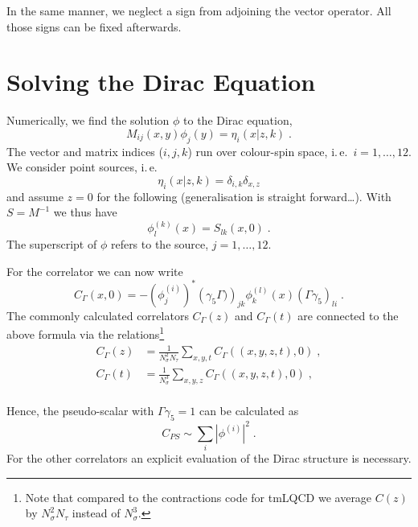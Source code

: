 \documentclass[a4paper]{article}
\begin{document}
In the same manner, we neglect a sign from adjoining the vector operator. All those signs can be fixed afterwards.


\section{Solving the Dirac Equation}
Numerically, we find the solution $\phi$ to the Dirac equation,
\begin{equation}
M_{ij}(x,y) \phi_j(y) = \eta_i(x|z,k)\;.
\end{equation}
The vector and matrix indices ($i,j,k$) run over colour-spin space, i.\,e.\ $i=1,\ldots,12$. We consider point sources, i.\,e.\
\begin{equation}
\eta_i(x|z,k) = \delta_{i,k} \delta_{x,z}
\end{equation}
and assume $z=0$ for the following (generalisation is straight forward\ldots).  With $S=M^{-1}$ we thus have
\begin{equation}
\phi_l^{(k)}(x) = S_{lk}(x,0)\;.
\end{equation}
The superscript of $\phi$ refers to the source, $j=1,\ldots,12$.

For the correlator we can now write
\begin{equation}
C_\Gamma(x,0) = - \left(\phi_j^{(i)}\right)^* \left(\gamma_5\Gamma)\right)_{jk} \phi_k^{(l)}(x) \left(\Gamma\gamma_5\right)_{li}\;.
\end{equation}
The commonly calculated correlators $C_\Gamma(z)$ and $C_\Gamma(t)$ are connected to the above formula via the relations\footnote{Note that compared to the contractions code for tmLQCD we average $C(z)$ by $N_\sigma^2N_\tau$ instead of $N_\sigma^3$.}
\begin{subequations}
\begin{align}
C_\Gamma(z) & = \frac{1}{N_\sigma^2 N_\tau} \sum_{x,y,t} C_\Gamma( (x,y,z,t), 0 )\;,\\
C_\Gamma(t) & = \frac{1}{N_\sigma^3} \sum_{x,y,z} C_\Gamma( (x,y,z,t), 0 )\;,\\
\end{align}
\end{subequations}

Hence, the pseudo-scalar with $\Gamma\gamma_5=1$ can be calculated as
\begin{equation}
C_{PS}  \sim \sum_i \left| \phi^{(i)} \right|^2\;.
\end{equation}
For the other correlators an explicit evaluation of the Dirac structure is necessary.
\end{document}
